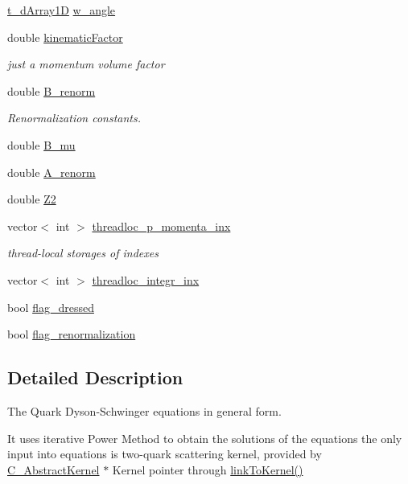 \begin{DoxyCompactItemize}
\item 
\hyperlink{types_8h_a7572e8a35cd6501ce959f177307310a4}{t\-\_\-d\-Array1\-D} \hyperlink{class_c___quark_a5a5d2e8dd42a3990344fce6be1667ca4}{w\-\_\-angle}
\item 
double \hyperlink{class_c___quark_ad668099da3ad48b3adf1c2df771cb62c}{kinematic\-Factor}
\begin{DoxyCompactList}\small\item\em just a momentum volume factor \end{DoxyCompactList}\item 
double \hyperlink{class_c___quark_a3bcdcd4f5f0e106f159542b782044b31}{B\-\_\-renorm}
\begin{DoxyCompactList}\small\item\em Renormalization constants. \end{DoxyCompactList}\item 
double \hyperlink{class_c___quark_aaa7b2b26853f8405c2b9b293d2c18a64}{B\-\_\-mu}
\item 
double \hyperlink{class_c___quark_ac5de0438d1b19d8a7f7509efff53b978}{A\-\_\-renorm}
\item 
double \hyperlink{class_c___quark_ae05f046433b0143198cf37dd0294236c}{Z2}
\item 
vector$<$ int $>$ \hyperlink{class_c___quark_a16276524396db70cf500004e4732b62e}{threadloc\-\_\-p\-\_\-momenta\-\_\-inx}
\begin{DoxyCompactList}\small\item\em thread-\/local storages of indexes \end{DoxyCompactList}\item 
vector$<$ int $>$ \hyperlink{class_c___quark_a96dfb638401816915fc1728cb4587f2a}{threadloc\-\_\-integr\-\_\-inx}
\item 
bool \hyperlink{class_c___quark_a88da2d4e54ff2d0194691e9ebf0313cc}{flag\-\_\-dressed}
\item 
bool \hyperlink{class_c___quark_ab74616977c12b63b1bb3937656b2a580}{flag\-\_\-renormalization}
\end{DoxyCompactItemize}


\subsection{Detailed Description}
The Quark Dyson-\/\-Schwinger equations in general form. 

It uses iterative Power Method to obtain the solutions of the equations the only input into equations is two-\/quark scattering kernel, provided by \hyperlink{class_c___abstract_kernel}{C\-\_\-\-Abstract\-Kernel} $\ast$ Kernel pointer through \hyperlink{class_c___quark_aea358bb9c82c6e62d99c69893cc35cf9}{link\-To\-Kernel()}


